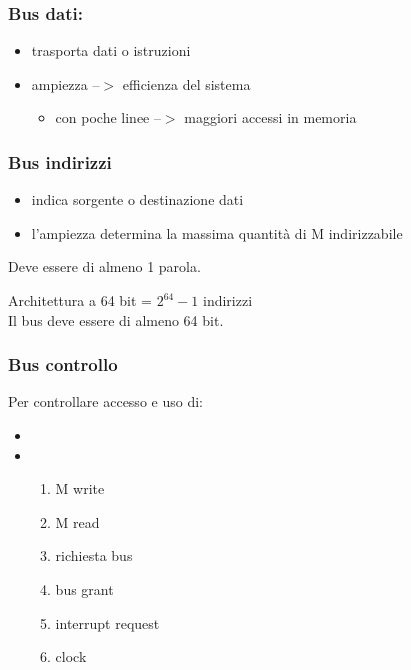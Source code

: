 \documentclass[12pt, a4paper]{article}
\begin{document}
\subsubsection{Bus dati:}
\begin{itemize}
	\item trasporta dati o istruzioni
	\item ampiezza --$ > $ efficienza  del sistema
	\begin{itemize}
		\item con poche linee --$>$ maggiori accessi in memoria
	\end{itemize}
\end{itemize}

\subsubsection{Bus indirizzi}
\begin{itemize}
	\item indica sorgente o destinazione dati
	\item l'ampiezza determina la massima quantità di M indirizzabile
\end{itemize}
Deve essere di almeno 1 parola.

\begin{esem}
Architettura a 64 bit = $ 2^{64} - 1 $ indirizzi\\
Il bus deve essere di almeno 64 bit.
\end{esem}


\subsubsection{Bus controllo}
Per controllare accesso e uso di:

\begin{itemize}
	\item {}
	\item {}
	\begin{enumerate}
		\item M write
		\item M read
		\item richiesta bus
		\item bus grant
		\item interrupt request
		\item clock
	\end{enumerate}
\end{itemize}
\end{document}
